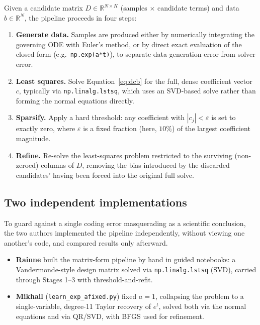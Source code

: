 \documentclass[11pt]{article}
\begin{document}
Given a candidate matrix $D \in \mathbb{R}^{N \times K}$ (samples $\times$ candidate
terms) and data $b \in \mathbb{R}^{N}$, the pipeline proceeds in four steps:

\begin{enumerate}
  \item \textbf{Generate data.} Samples are produced either by numerically integrating
  the governing ODE with Euler's method, or by direct exact evaluation of the closed
  form (e.g.\ \texttt{np.exp(a*t)}), to separate data-generation error from solver error.
  \item \textbf{Least squares.} Solve Equation~\eqref{eq:dcb} for the full,
  dense coefficient vector $c$, typically via \texttt{np.linalg.lstsq}, which uses an
  SVD-based solve rather than forming the normal equations directly.
  \item \textbf{Sparsify.} Apply a hard threshold: any coefficient with
  $|c_j| < \varepsilon$ is set to exactly zero, where $\varepsilon$ is a fixed fraction
  (here, $10\%$) of the largest coefficient magnitude.
  \item \textbf{Refine.} Re-solve the least-squares problem restricted to the
  surviving (non-zeroed) columns of $D$, removing the bias introduced by the discarded
  candidates' having been forced into the original full solve.
\end{enumerate}

\subsection{Two independent implementations}

To guard against a single coding error masquerading as a scientific conclusion, the two
authors implemented the pipeline independently, without viewing one another's code, and
compared results only afterward.

\begin{itemize}
  \item \textbf{Rainne} built the matrix-form pipeline by hand in guided notebooks: a
  Vandermonde-style design matrix solved via \texttt{np.linalg.lstsq} (SVD), carried
  through Stages 1--3 with threshold-and-refit.
  \item \textbf{Mikhail} (\texttt{learn\_exp\_afixed.py}) fixed $a=1$, collapsing the
  problem to a single-variable, degree-11 Taylor recovery of $e^{t}$, solved both via the
  normal equations and via QR/SVD, with BFGS used for refinement.
\end{itemize}
\end{document}

